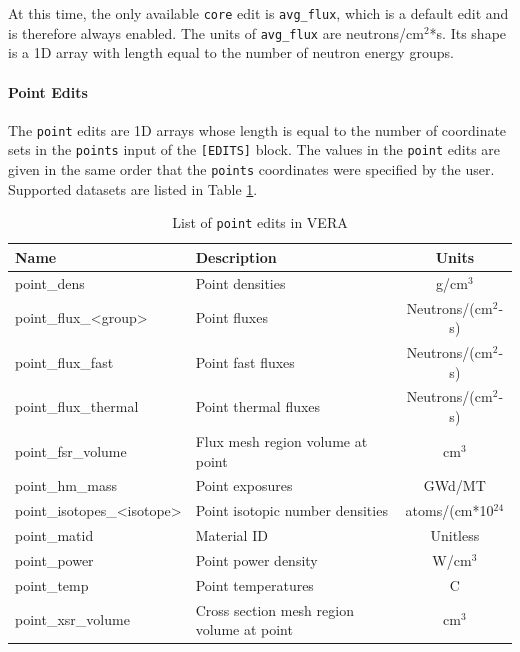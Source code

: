 At this time, the only available \texttt{core} edit is \texttt{avg\_flux}, which is a default edit and is therefore always enabled.  The units of \texttt{avg\_flux} are neutrons/cm$^2$*s.  Its shape is a 1D array with length equal to the number of neutron energy groups.

\FloatBarrier

\paragraph{Point Edits}\label{sec:point-edits}

The \texttt{point} edits are 1D arrays whose length is equal to the number of coordinate sets in the \texttt{points} input of the \texttt{[EDITS]} block.  The values in the \texttt{point} edits are given in the same order that the \texttt{points} coordinates were specified by the user.  Supported datasets are listed in Table \ref{tab:point-edits}.

\begin{table}[h]
    \centering
    \caption{List of \texttt{point} edits in VERA}
    \label{tab:point-edits}
    \begin{tabular}{|l|p{}|c|}\hline
    {\bf Name} & {\bf Description} & {\bf Units} \\\hline
    point\_dens & Point densities & g/cm$^3$  \\\hline
    point\_flux\_<group> & Point fluxes & Neutrons/(cm$^2$-s)  \\\hline
    point\_flux\_fast & Point fast fluxes & Neutrons/(cm$^2$-s)  \\\hline
    point\_flux\_thermal & Point thermal fluxes & Neutrons/(cm$^2$-s)  \\\hline
    point\_fsr\_volume & Flux mesh region volume at point &  cm$^3$ \\\hline
    point\_hm\_mass & Point exposures & GWd/MT  \\\hline
    point\_isotopes\_<isotope> & Point isotopic number densities & atoms/(cm*10$^{24}$  \\\hline
    point\_matid & Material ID & Unitless  \\\hline
    point\_power & Point power density & W/cm$^3$  \\\hline
    point\_temp & Point temperatures & C  \\\hline
    point\_xsr\_volume & Cross section mesh region volume at point & cm$^3$  \\\hline
    \end{tabular}
\end{table}

